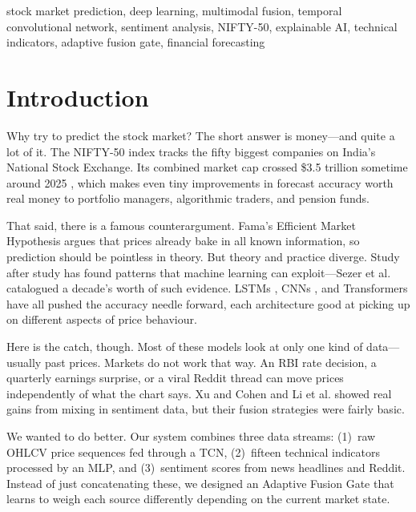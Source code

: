 \documentclass[conference]{IEEEtran}
\begin{document}
\begin{IEEEkeywords}
stock market prediction, deep learning, multimodal fusion, temporal convolutional network, sentiment analysis, NIFTY-50, explainable AI, technical indicators, adaptive fusion gate, financial forecasting
\end{IEEEkeywords}

\section{Introduction}
Why try to predict the stock market? The short answer is money---and quite a lot of it. The NIFTY-50 index tracks the fifty biggest companies on India's National Stock Exchange. Its combined market cap crossed \$3.5 trillion sometime around 2025 \cite{nse2024}, which makes even tiny improvements in forecast accuracy worth real money to portfolio managers, algorithmic traders, and pension funds.

That said, there is a famous counterargument. Fama's Efficient Market Hypothesis \cite{fama2015} argues that prices already bake in all known information, so prediction should be pointless in theory. But theory and practice diverge. Study after study has found patterns that machine learning can exploit---Sezer et al. \cite{sezer2020} catalogued a decade's worth of such evidence. LSTMs \cite{fischer2018}, CNNs \cite{hoseinzade2019}, and Transformers \cite{ding2020} have all pushed the accuracy needle forward, each architecture good at picking up on different aspects of price behaviour.

Here is the catch, though. Most of these models look at only one kind of data---usually past prices. Markets do not work that way. An RBI rate decision, a quarterly earnings surprise, or a viral Reddit thread can move prices independently of what the chart says. Xu and Cohen \cite{xu2018} and Li et al. \cite{li2020sentiment} showed real gains from mixing in sentiment data, but their fusion strategies were fairly basic.

We wanted to do better. Our system combines three data streams: (1)~raw OHLCV price sequences fed through a TCN, (2)~fifteen technical indicators processed by an MLP, and (3)~sentiment scores from news headlines and Reddit. Instead of just concatenating these, we designed an Adaptive Fusion Gate that learns to weigh each source differently depending on the current market state.
\end{document}
